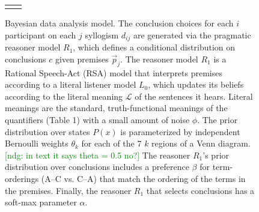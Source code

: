 \documentclass[floatsintext, doc]{apa6}
\newcommand{\ndg}[1]{{\textcolor{Green}{[ndg: #1]}}}
\begin{document}
\begin{figure}[ht!]
\begin{center}
\begin{tabular}{cc}
\begin{tikzpicture}
%


\end{tikzpicture}

    \end{tabular}
  \end{center}
  \caption{\small Bayesian data analysis model. The conclusion choices for each $i$ participant on each $j$ syllogism $d_{ij}$ are generated via the pragmatic reasoner model $R_1$, which defines a conditional distribution on conclusions $c$ given premises $\vec{p}_j$. The reasoner model $R_1$ is a Rational Speech-Act (RSA) model that interprets premises according to a literal listener model $L_0$, which updates its beliefs according to the literal meaning $\mathcal{L}$ of the sentences it hears. Literal meanings are the standard, truth-functional meanings of the quantifiers (Table 1\label{tab:sem}) with a small amount of noise $\phi$. The prior distribution over states $P(x)$ is parameterized by independent Bernoulli weights $\theta_k$ for each of the 7 $k$ regions of a Venn diagram. \ndg{in text it says theta = 0.5 no?} The reasoner $R_1$'s prior distribution over conclusions includes a preference $\beta$ for term-orderings (A--C vs. C--A) that match the ordering of the terms in the premises. Finally, the reasoner $R_1$ that selects conclusions has a soft-max parameter $\alpha$.}
  \label{fig:bayesnet}
\end{figure}
\end{document}
